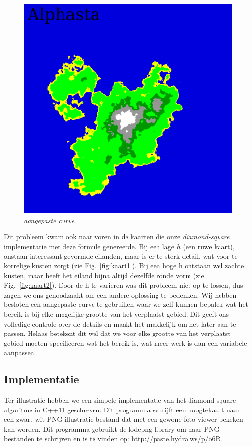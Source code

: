 \documentclass{article}
\begin{document}
\begin{figure}
{    \includegraphics[width=0.9\linewidth]{kaart3.png}%
    \caption{\emph{aangepaste curve}\cite{kaart}}%
  \label{fig:kaart3}}%
\end{figure}

Dit probleem kwam ook naar voren in de kaarten die onze \emph{diamond-square} implementatie met deze formule genereerde. Bij een lage $h$ (een ruwe kaart), onstaan interessant gevormde eilanden, maar is er te sterk detail, wat voor te korrelige kusten zorgt (zie Fig.~\ref{fig:kaart1}). Bij een hoge h ontstaan wel zachte kusten, maar heeft het eiland bijna altijd dezelfde ronde vorm (zie Fig.~\ref{fig:kaart2}). Door de h te varieren was dit probleem niet op te lossen, dus zagen we ons genoodzaakt om een andere oplossing te bedenken. Wij hebben besloten een aangepaste curve te gebruiken waar we zelf kunnen bepalen wat het bereik is bij elke mogelijke grootte van het verplaatst gebied. Dit geeft ons volledige controle over de details en maakt het makkelijk om het later aan te passen. Helaas betekent dit wel dat we voor elke grootte van het verplaatst gebied moeten specificeren wat het bereik is, wat meer werk is dan een variabele aanpassen.

\subsection{Implementatie}

Ter illustratie hebben we een simpele implementatie van het diamond-square algoritme in C++11 geschreven. Dit programma schrijft een hoogtekaart naar een zwart-wit PNG-illustratie bestand dat met een gewone foto viewer bekeken kan worden. Dit programma gebruikt de lodepng library om naar PNG-bestanden te schrijven en is te vinden op: \url{http://paste.hydra.ws/p/o6R}.

\newpage

\end{document}
